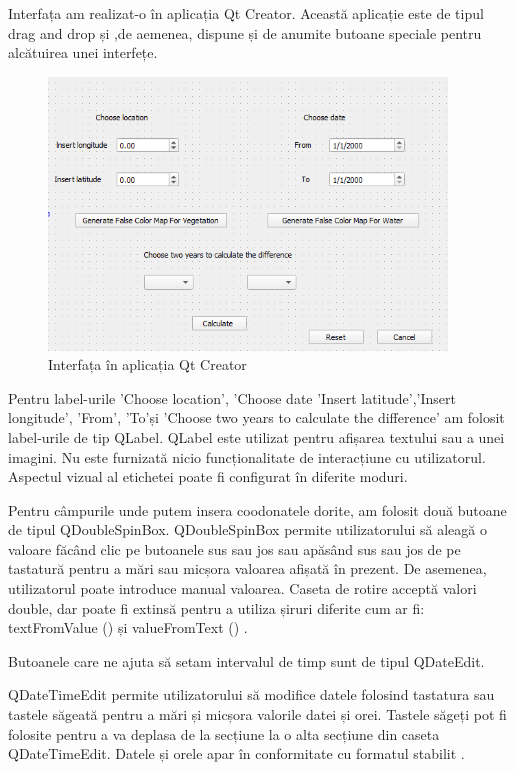 \documentclass[12pt,a4paper]{article}
\theoremstyle{definition}
\theoremstyle{remark}
\begin{document}
Interfața am realizat-o în aplicația Qt Creator. Această aplicație este de tipul drag and drop și ,de aemenea, dispune și de anumite butoane speciale pentru alcătuirea unei interfețe.



\begin{figure}[H]
  \centering
  \includegraphics[width=300pt]{guinou.png}
  \caption{Interfața în aplicația Qt Creator}   
\end{figure}


Pentru label-urile 'Choose location', 'Choose date  'Insert latitude','Insert longitude', 'From', 'To'și 'Choose two years to calculate the difference' am folosit label-urile de tip QLabel. QLabel este utilizat pentru afișarea textului sau a unei imagini. Nu este furnizată nicio funcționalitate de interacțiune cu utilizatorul. Aspectul vizual al etichetei poate fi configurat în diferite moduri.

Pentru câmpurile unde putem insera coodonatele dorite, am folosit două butoane de tipul QDoubleSpinBox.
QDoubleSpinBox permite utilizatorului să aleagă o valoare făcând clic pe butoanele sus sau jos sau apăsând sus sau jos de pe tastatură pentru a mări sau micșora valoarea afișată în prezent. De asemenea, utilizatorul poate introduce manual valoarea. Caseta de rotire acceptă valori double, dar poate fi extinsă pentru a utiliza șiruri diferite cum ar fi: textFromValue () și valueFromText () \cite{coordonate}.

Butoanele care ne ajuta să setam intervalul de timp sunt de tipul QDateEdit.

QDateTimeEdit permite utilizatorului să modifice datele folosind tastatura sau tastele săgeată pentru a mări și micșora valorile datei și orei. Tastele săgeți pot fi folosite pentru a va deplasa de la secțiune la o alta  secțiune din caseta QDateTimeEdit. Datele și orele apar în conformitate cu formatul stabilit \cite{date}.
\end{document}

